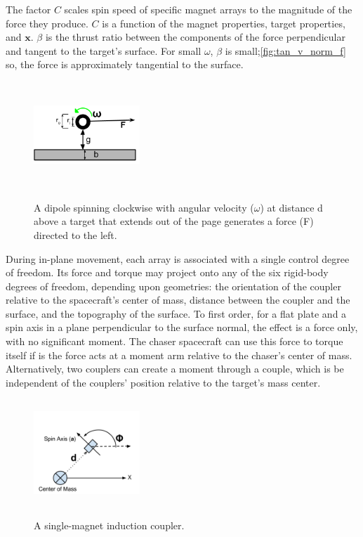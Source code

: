 The factor $C$ scales spin speed of specific magnet arrays to the magnitude of the force they produce. $C$ is a function of the magnet properties, target properties, and $\boldsymbol{x}$. $\beta$ is the thrust ratio between the components of the force perpendicular and tangent to the target's surface. For small $\omega$, $\beta$ is small;\ref{fig:tan_v_norm_f} so, the force is approximately tangential to the surface.

\begin{figure}
\includegraphics[width = 4cm, height = 4cm ]{figures/force_diagram.png}
\label{fig:arry_force_diagram}
\caption{A dipole spinning clockwise with angular velocity ($\omega$) at distance d above a target that extends out of the page generates a force (F) directed to the left.}
\end{figure}

During in-plane movement, each array is associated with a single control degree of freedom. Its force and torque may project onto any of the six rigid-body degrees of freedom, depending upon geometries: the orientation of the coupler relative to the spacecraft’s ‎center ‎of ‎mass, ‎distance between the coupler and the surface, and the topography of the surface. To first order, for a flat plate and a spin axis in a plane perpendicular to the surface normal, the effect is a force only, with no significant moment. The chaser spacecraft can use this force to torque itself if is the force acts at a moment arm relative to the chaser’s center of mass. Alternatively, two couplers can create a moment through a couple, which is be independent of‎ the‎ couplers’‎ position relative to‎ the‎ target’s‎ mass‎ center.


\begin{figure}
\includegraphics[width = 4cm, height = 4cm ]{figures/minimum_array.png}
\label{fig:min_array_diagram}
\caption{A single-magnet induction coupler.}
\end{figure}

